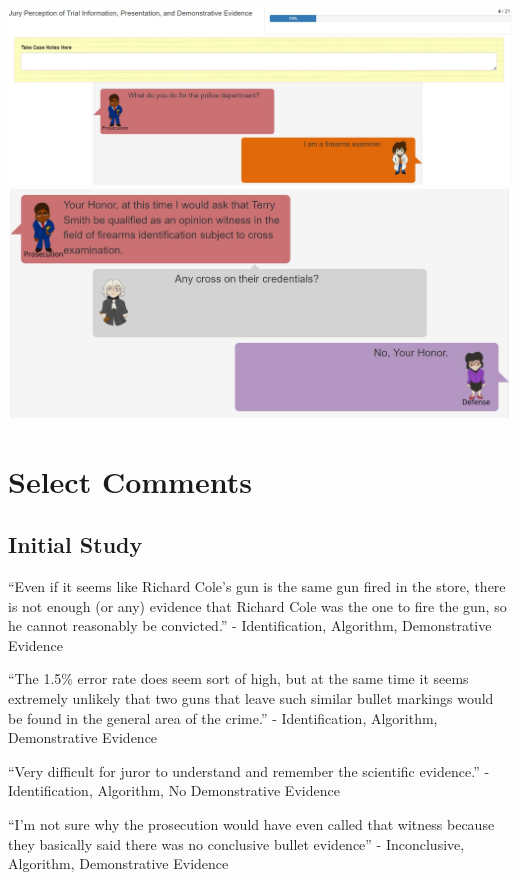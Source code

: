 \documentclass[print]{nuthesis}
\begin{document}
\includegraphics[width=\linewidth]{images/Study2_Screenshot}
\includegraphics[width=\linewidth]{images/Study2_Screenshot2}

\hypertarget{select-comments}{%
\chapter{Select Comments}\label{select-comments}}

\hypertarget{initial-study}{%
\section{Initial Study}\label{initial-study}}

``Even if it seems like Richard Cole's gun is the same gun fired in the store, there is not enough (or any) evidence that Richard Cole was the one to fire the gun, so he cannot reasonably be convicted.'' - Identification, Algorithm, Demonstrative Evidence

``The 1.5\% error rate does seem sort of high, but at the same time it seems extremely unlikely that two guns that leave such similar bullet markings would be found in the general area of the crime.'' - Identification, Algorithm, Demonstrative Evidence

``Very difficult for juror to understand and remember the scientific evidence.'' - Identification, Algorithm, No Demonstrative Evidence

``I'm not sure why the prosecution would have even called that witness because they basically said there was no conclusive bullet evidence'' - Inconclusive, Algorithm, Demonstrative Evidence
\end{document}
